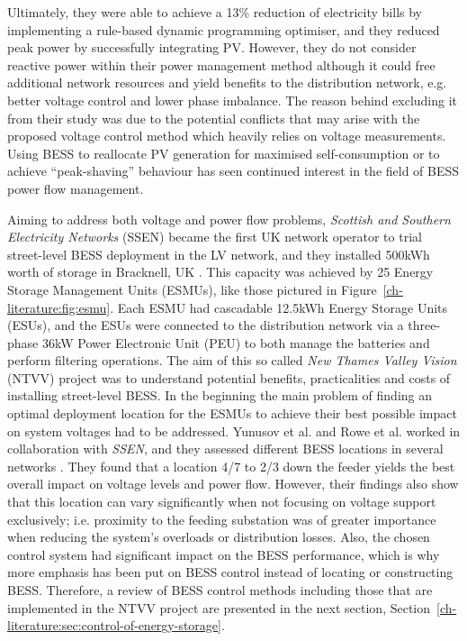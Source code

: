 Ultimately, they were able to achieve a 13\% reduction of electricity bills by implementing a rule-based dynamic programming optimiser, and they reduced peak power by successfully integrating PV.
However, they do not consider reactive power within their power management method although it could free additional network resources and yield benefits to the distribution network, e.g. better voltage control and lower phase imbalance.
The reason behind excluding it from their study was due to the potential conflicts that may arise with the proposed voltage control method which heavily relies on voltage measurements.
Using BESS to reallocate PV generation for maximised self-consumption \cite{SaniHassan2017} or to achieve ``peak-shaving'' behaviour \cite{Bennett2015, DePaola2016} has seen continued interest in the field of BESS power flow management.



Aiming to address both voltage and power flow problems, \textit{Scottish and Southern Electricity Networks} (SSEN) became the first UK network operator to trial street-level BESS deployment in the LV network, and they installed 500kWh worth of storage in Bracknell, UK \cite{SSEN2016}.
This capacity was achieved by 25 Energy Storage Management Units (ESMUs), like those pictured in Figure~\ref{ch-literature:fig:esmu}.
Each ESMU had cascadable 12.5kWh Energy Storage Units (ESUs), and the ESUs were connected to the distribution network via a three-phase 36kW Power Electronic Unit (PEU) to both manage the batteries and perform filtering operations.
The aim of this so called \textit{New Thames Valley Vision} (NTVV) project was to understand potential benefits, practicalities and costs of installing street-level BESS.
In the beginning the main problem of finding an optimal deployment location for the ESMUs to achieve their best possible impact on system voltages had to be addressed.
Yunusov et al. and Rowe et al. worked in collaboration with \textit{SSEN}, and they assessed different BESS locations in several networks \cite{Yunusov2016, Rowe2014, Rowe2014a}.
They found that a location 4/7 to 2/3 down the feeder yields the best overall impact on voltage levels and power flow.
However, their findings also show that this location can vary significantly when not focusing on voltage support exclusively; i.e. proximity to the feeding substation was of greater importance when reducing the system's overloads or distribution losses.
Also, the chosen control system had significant impact on the BESS performance, which is why more emphasis has been put on BESS control instead of locating or constructing BESS.
Therefore, a review of BESS control methods including those that are implemented in the NTVV project are presented in the next section, Section~\ref{ch-literature:sec:control-of-energy-storage}.








